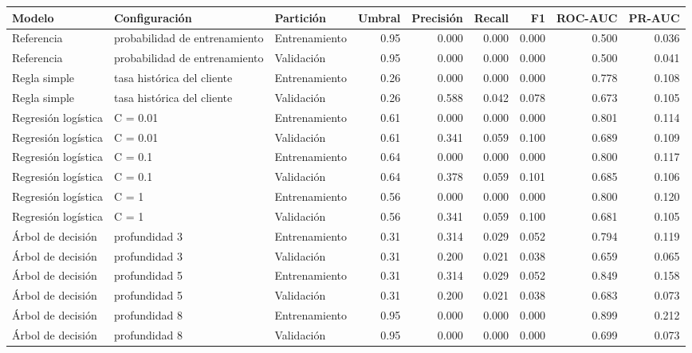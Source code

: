 \begin{tabular}{lllrrrrrr}
\toprule
Modelo & Configuración & Partición & Umbral & Precisión & Recall & F1 & ROC-AUC & PR-AUC \\
\midrule
Referencia & probabilidad de entrenamiento & Entrenamiento & 0.95 & 0.000 & 0.000 & 0.000 & 0.500 & 0.036 \\
Referencia & probabilidad de entrenamiento & Validación & 0.95 & 0.000 & 0.000 & 0.000 & 0.500 & 0.041 \\
Regla simple & tasa histórica del cliente & Entrenamiento & 0.26 & 0.000 & 0.000 & 0.000 & 0.778 & 0.108 \\
Regla simple & tasa histórica del cliente & Validación & 0.26 & 0.588 & 0.042 & 0.078 & 0.673 & 0.105 \\
Regresión logística & C = 0.01 & Entrenamiento & 0.61 & 0.000 & 0.000 & 0.000 & 0.801 & 0.114 \\
Regresión logística & C = 0.01 & Validación & 0.61 & 0.341 & 0.059 & 0.100 & 0.689 & 0.109 \\
Regresión logística & C = 0.1 & Entrenamiento & 0.64 & 0.000 & 0.000 & 0.000 & 0.800 & 0.117 \\
Regresión logística & C = 0.1 & Validación & 0.64 & 0.378 & 0.059 & 0.101 & 0.685 & 0.106 \\
Regresión logística & C = 1 & Entrenamiento & 0.56 & 0.000 & 0.000 & 0.000 & 0.800 & 0.120 \\
Regresión logística & C = 1 & Validación & 0.56 & 0.341 & 0.059 & 0.100 & 0.681 & 0.105 \\
Árbol de decisión & profundidad 3 & Entrenamiento & 0.31 & 0.314 & 0.029 & 0.052 & 0.794 & 0.119 \\
Árbol de decisión & profundidad 3 & Validación & 0.31 & 0.200 & 0.021 & 0.038 & 0.659 & 0.065 \\
Árbol de decisión & profundidad 5 & Entrenamiento & 0.31 & 0.314 & 0.029 & 0.052 & 0.849 & 0.158 \\
Árbol de decisión & profundidad 5 & Validación & 0.31 & 0.200 & 0.021 & 0.038 & 0.683 & 0.073 \\
Árbol de decisión & profundidad 8 & Entrenamiento & 0.95 & 0.000 & 0.000 & 0.000 & 0.899 & 0.212 \\
Árbol de decisión & profundidad 8 & Validación & 0.95 & 0.000 & 0.000 & 0.000 & 0.699 & 0.073 \\
\bottomrule
\end{tabular}
